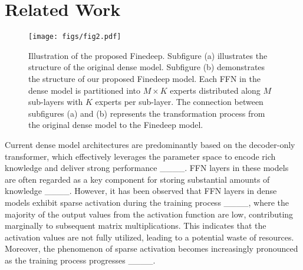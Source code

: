 \section{Related Work}
\begin{figure*}[t]
\centering
\centerline{\texttt{[image: figs/fig2.pdf]}}
\caption{Illustration of the proposed Finedeep. Subfigure (a) illustrates the structure of the original dense model. Subfigure (b) demonstrates the structure of our proposed Finedeep model. Each FFN in the dense model is partitioned into $M\times K$ experts distributed along $M$ sub-layers with $K$ experts per sub-layer. The connection between subfigures (a) and (b) represents the transformation process from the original dense model to the Finedeep model.}
\label{fig2}
\end{figure*}

Current dense model architectures are predominantly based on the decoder-only transformer, which effectively leverages the parameter space to encode rich knowledge and deliver strong performance ____. FFN layers in these models are often regarded as a key component for storing substantial amounts of knowledge ____. However, it has been observed that FFN layers in dense models exhibit sparse activation during the training process ____, where the majority of the output values from the activation function are low, contributing marginally to subsequent matrix multiplications. This indicates that the activation values are not fully utilized, leading to a potential waste of resources. Moreover, the phenomenon of sparse activation becomes increasingly pronounced as the training process progresses ____.


